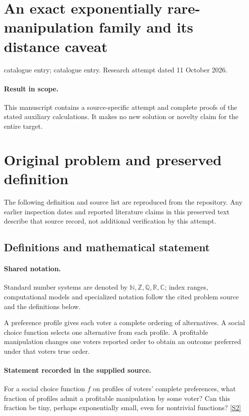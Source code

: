 \documentclass[11pt]{article}
\begin{document}
\section*{An exact exponentially rare-manipulation family and its distance caveat}
\noindent catalogue entry; catalogue entry. Research attempt dated 11 October 2026.
\paragraph{Result in scope.}This manuscript contains a source-specific attempt and complete proofs of the stated auxiliary calculations. It makes no new solution or novelty claim for the entire target.
\section{Original problem and preserved definition}
The following definition and source list are reproduced from the repository. Any earlier inspection dates and reported literature claims in this preserved text describe that source record, not additional verification by this attempt.
\subsection{Definitions and mathematical statement}

\paragraph{Shared notation.}Standard number systems are denoted by $\mathbb N,\mathbb Z,\mathbb Q,\mathbb R,\mathbb C$; index ranges, computational models and specialized notation follow the cited problem source and the definitions below.


A preference profile gives each voter a complete ordering of alternatives. A social choice function selects one alternative from each profile. A profitable manipulation changes one voter\textquotesingle s reported order to obtain an outcome preferred under that voter\textquotesingle s true order.
\paragraph{Statement recorded in the supplied source.}
For a social choice function $f$ on profiles of voters' complete preferences, what fraction of profiles admit a profitable manipulation by some voter? Can this fraction be tiny, perhaps exponentially small, even for nontrivial functions? \href{https://doi.org/10.4171/owr/2008/01}{[S2]}
\end{document}
